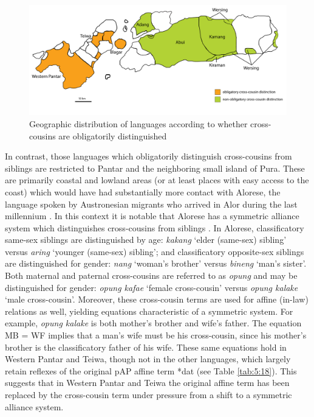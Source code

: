 \begin{figure}[h]
\includegraphics[width=\textwidth]{figures/Holton_ch5_fig15.pdf}
\caption{Geographic distribution of languages according to whether  cross-cousins are obligatorily distinguished}
\label{fig_cross-cousin_map}
\label{fig:5:15}
\end{figure}  
 

In contrast, those languages which obligatorily distinguish cross-cousins from siblings are restricted to Pantar and the neighboring small island of Pura. These are primarily coastal and lowland areas (or at least places with easy access to the coast) which would have had substantially more contact with Alorese, the language spoken by Austronesian migrants who arrived in Alor during the last millennium \citep{Klamer2011}. In this context it is notable that Alorese has a symmetric alliance system which distinguishes cross-cousins from siblings \citep{Needham1956,Barnes1973}. In Alorese, classificatory same-sex siblings are distinguished by age: \textit{kakang} `elder (same-sex) sibling' versus \textit{aring} `younger (same-sex) sibling'; and classificatory opposite-sex siblings are distinguished for gender: \textit{nang} `woman's brother' versus \textit{bineng} `man's sister'. Both maternal and paternal cross-cousins are referred to as \textit{opung} and may be distinguished for gender: \textit{opung kafae} `female cross-cousin' versus \textit{opung kalake} `male cross-cousin'. Moreover, these cross-cousin terms are used for affine (in-law) relations as well, yielding equations characteristic of a symmetric system. For example, \textit{opung kalake} is both mother's brother and wife's father. The equation MB = WF implies that a man's wife must be his cross-cousin, since his mother's brother is the classificatory father of his wife. These same equations hold in Western Pantar and Teiwa, though not in the other languages, which largely retain reflexes of the original pAP affine term *dat (see Table \ref{tab:5:18}). This suggests that in Western Pantar and Teiwa the original affine term has been replaced by the cross-cousin term under pressure from a shift to a symmetric alliance system. 



